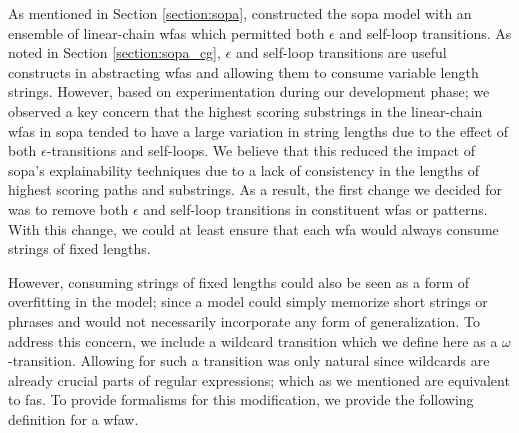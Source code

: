As mentioned in Section \ref{section:sopa}, \citet{schwartz2018sopa} constructed
the \ac{sopa} model with an ensemble of linear-chain \ac{wfas} which permitted both
$\epsilon$ and self-loop transitions. As noted in Section \ref{section:sopa_cg},
$\epsilon$ and self-loop transitions are useful constructs in abstracting \ac{wfas}
and allowing them to consume variable length strings. However, based on
experimentation during our development phase; we observed a key concern that the
highest scoring substrings in the linear-chain \ac{wfas} in \ac{sopa} tended to have a
large variation in string lengths due to the effect of both
$\epsilon$-transitions and self-loops. We believe that this reduced the impact
of \ac{sopa}'s explainability techniques due to a lack of consistency in the lengths
of highest scoring paths and substrings. As a result, the first change we decided
for was to remove both $\epsilon$ and self-loop transitions in constituent \ac{wfas}
or patterns. With this change, we could at least ensure that each \ac{wfa} would
always consume strings of fixed lengths.

However, consuming strings of fixed lengths could also be seen as a form of
overfitting in the model; since a model could simply memorize short strings or
phrases and would not necessarily incorporate any form of generalization. To
address this concern, we include a wildcard transition which we define here as a
$\omega$-transition. Allowing for such a transition was only natural since
wildcards are already crucial parts of regular expressions; which as we
mentioned are equivalent to \ac{fas}. To provide formalisms for this modification, we
provide the following definition for a \ac{wfaw}.

